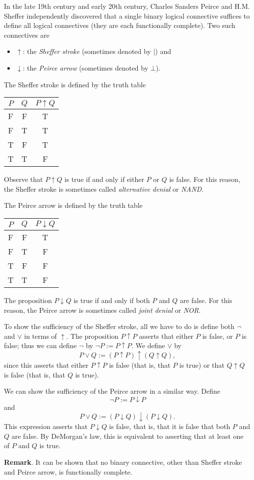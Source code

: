 \documentclass[12pt]{article}
\begin{document}
In the late 19th century and early 20th century, Charles Sanders Peirce and H.M. Sheffer independently discovered that a single binary logical connective suffices to define all logical connectives (they are each functionally complete).  Two such connectives are
\begin{itemize}
\item
$\uparrow$: the \emph{Sheffer stroke} (sometimes denoted by $|$) and

\item
$\downarrow$: the \emph{Peirce arrow} (sometimes denoted by $\bot$).
\end{itemize}

The Sheffer stroke is defined by the truth table
\begin{center}
\begin{tabular}{ccc}
$P$ & $Q$ & $P \uparrow Q$ \\
\hline
F & F & T \\
F & T & T \\
T & F & T \\
T & T & F
\end{tabular}
\end{center}
Observe that $P\uparrow Q$ is true if and only if either $P$ or $Q$ is false.  For this reason, the Sheffer stroke is sometimes called \emph{alternative denial} or \emph{NAND}.

The Peirce arrow is defined by the truth table
\begin{center}
\begin{tabular}{ccc}
$P$ & $Q$ & $P \downarrow Q$ \\
\hline
F & F & T \\
F & T & F \\
T & F & F \\
T & T & F
\end{tabular}
\end{center}
The proposition $P\downarrow Q$ is true if and only if both $P$ and $Q$ are false.  For this reason, the Peirce arrow is sometimes called \emph{joint denial} or \emph{NOR}.

To show the sufficiency of the Sheffer stroke, all we have to do is define both $\lnot$ and $\lor$ in terms of $\uparrow$.  The proposition $P\uparrow P$ asserts that either $P$ is false, or $P$ is false; thus we can define $\lnot$ by $\lnot P := P\uparrow P$.  We define $\lor$ by 
\[
P \lor Q := (P\uparrow P)\uparrow(Q\uparrow Q),
\]
since this asserts that either $P\uparrow P$ is false (that is, that $P$ is true) or that $Q\uparrow Q$ is false (that is, that $Q$ is true).

We can show the sufficiency of the Peirce arrow in a similar way.  Define
\[
\lnot P := P\downarrow P
\]
and
\[
P\lor Q := (P\downarrow Q)\downarrow(P\downarrow Q).
\]
This expression asserts that $P\downarrow Q$ is false, that is, that it is false that both $P$ and $Q$ are false.  By DeMorgan's law, this is equivalent to asserting that at least one of $P$ and $Q$ is true.

\textbf{Remark}.  It can be shown that no binary connective, other than Sheffer stroke and Peirce arrow, is functionally complete.
\end{document}
